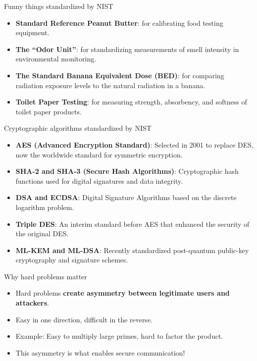 \documentclass[aspectratio=169, lualatex, handout]{beamer}
\begin{document}
\begin{frame}{Funny things standardized by NIST}
	\begin{itemize}[<+->]
		\item \textbf{Standard Reference Peanut Butter}: for calibrating food testing equipment.
		\item \textbf{The ``Odor Unit''}: for standardizing measurements of smell intensity in environmental monitoring.
		\item \textbf{The Standard Banana Equivalent Dose (BED)}: for comparing radiation exposure levels to the natural radiation in a banana.
		\item \textbf{Toilet Paper Testing}: for measuring strength, absorbency, and softness of toilet paper products.
	\end{itemize}
\end{frame}

\begin{frame}{Cryptographic algorithms standardized by NIST}
	\begin{itemize}[<+->]
		\item \textbf{AES (Advanced Encryption Standard)}: Selected in 2001 to replace DES, now the worldwide standard for symmetric encryption.
		\item \textbf{SHA-2 and SHA-3 (Secure Hash Algorithms)}: Cryptographic hash functions used for digital signatures and data integrity.
		\item \textbf{DSA and ECDSA}: Digital Signature Algorithms based on the discrete logarithm problem.
		\item \textbf{Triple DES}: An interim standard before AES that enhanced the security of the original DES.
		\item \textbf{ML-KEM and ML-DSA}: Recently standardized post-quantum public-key cryptography and signature schemes.
	\end{itemize}
\end{frame}

\begin{frame}{Why hard problems matter}
	\begin{itemize}
		\item Hard problems \textbf{create asymmetry between legitimate users and attackers}.
		\item Easy in one direction, difficult in the reverse.
		\item Example: Easy to multiply large primes, hard to factor the product.
		\item This asymmetry is what enables secure communication!
	\end{itemize}
\end{frame}
\end{document}
